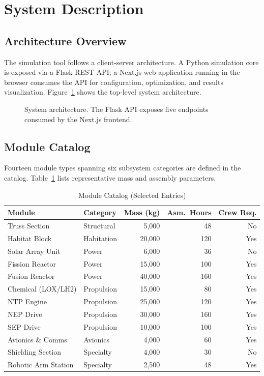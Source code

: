 \section{System Description}

\subsection{Architecture Overview}

The simulation tool follows a client-server architecture. A Python
simulation core is exposed via a Flask REST API; a Next.js web
application running in the browser consumes the API for configuration,
optimization, and results visualization. Figure~\ref{fig:arch} shows
the top-level system architecture.

\begin{figure}[htbp]
  \centering
  
  \caption{System architecture. The Flask API exposes five
           endpoints consumed by the Next.js frontend.}
  \label{fig:arch}
\end{figure}

\subsection{Module Catalog}

Fourteen module types spanning six subsystem categories are
defined in the catalog. Table~\ref{tab:modules} lists representative
mass and assembly parameters.

\begin{table}[htbp]
\centering
\caption{Module Catalog (Selected Entries)}
\label{tab:modules}
\begin{tabular}{llrrr}
\toprule
Module & Category & Mass (kg) & Asm.\ Hours & Crew Req. \\
\midrule
Truss Section       & Structural  & 5{,}000  & 48  & No  \\
Habitat Block       & Habitation  & 20{,}000 & 120 & Yes \\
Solar Array Unit    & Power       & 6{,}000  & 36  & No  \\
Fission Reactor     & Power       & 15{,}000 & 100 & Yes \\
Fusion Reactor      & Power       & 40{,}000 & 160 & Yes \\
Chemical (LOX/LH2)  & Propulsion  & 15{,}000 & 80  & Yes \\
NTP Engine          & Propulsion  & 25{,}000 & 120 & Yes \\
NEP Drive           & Propulsion  & 30{,}000 & 160 & Yes \\
SEP Drive           & Propulsion  & 10{,}000 & 100 & Yes \\
Avionics \& Comms   & Avionics    & 4{,}000  & 60  & Yes \\
Shielding Section   & Specialty   & 4{,}000  & 30  & No  \\
Robotic Arm Station & Specialty   & 2{,}500  & 48  & Yes \\
\bottomrule
\end{tabular}
\end{table}

